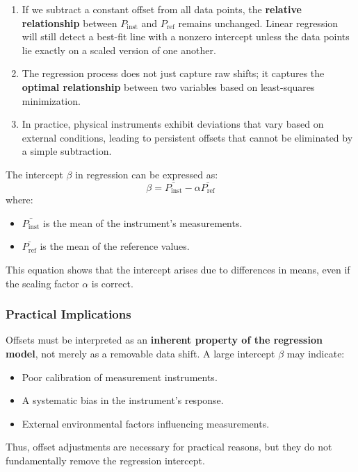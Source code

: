 \documentclass{article}
\begin{document}
\begin{enumerate}
	\item If we subtract a constant offset from all data points, the \textbf{relative relationship} between \( P_{\text{inst}} \) and \( P_{\text{ref}} \) remains unchanged. Linear regression will still detect a best-fit line with a nonzero intercept unless the data points lie exactly on a scaled version of one another.
	\item The regression process does not just capture raw shifts; it captures the \textbf{optimal relationship} between two variables based on least-squares minimization.
	\item In practice, physical instruments exhibit deviations that vary based on external conditions, leading to persistent offsets that cannot be eliminated by a simple subtraction.
\end{enumerate}
The intercept \( \beta \) in regression can be expressed as:
\begin{equation}
	\beta = \bar{P_{\text{inst}}} - \alpha \bar{P_{\text{ref}}}
\end{equation}
where:
\begin{itemize}
	\item \( \bar{P_{\text{inst}}} \) is the mean of the instrument’s measurements.
	\item \( \bar{P_{\text{ref}}} \) is the mean of the reference values.
\end{itemize}
This equation shows that the intercept arises due to differences in means, even if the scaling factor \( \alpha \) is correct.
\subsubsection{Practical Implications}
Offsets must be interpreted as an \textbf{inherent property of the regression model}, not merely as a removable data shift. A large intercept \( \beta \) may indicate:
\begin{itemize}[itemsep=-1mm]
	\item Poor calibration of measurement instruments.
	\item A systematic bias in the instrument’s response.
	\item External environmental factors influencing measurements.
\end{itemize}

Thus, offset adjustments are necessary for practical reasons, but they do not fundamentally remove the regression intercept.
\newpage
\end{document}
